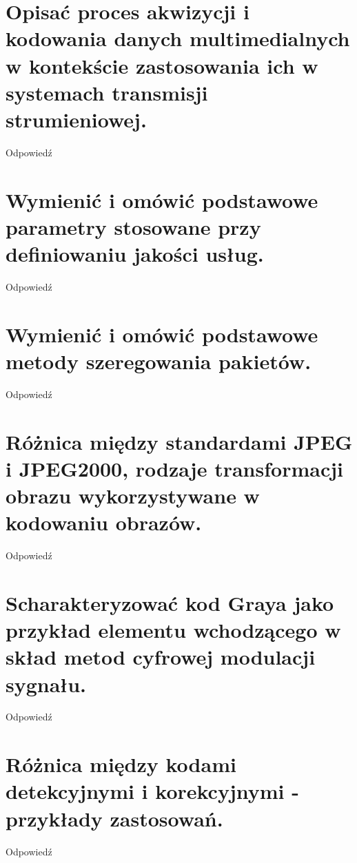\documentclass[12pt,a4paper]{article}
\begin{document}
	\section{Opisać proces akwizycji i kodowania danych multimedialnych w kontekście zastosowania ich w systemach transmisji strumieniowej.}
	Odpowiedź

	\section{Wymienić i omówić podstawowe parametry stosowane przy definiowaniu jakości usług.}
	Odpowiedź

	\section{Wymienić i omówić podstawowe metody szeregowania pakietów.}
	Odpowiedź

	\section{Różnica między standardami JPEG i JPEG2000, rodzaje transformacji obrazu wykorzystywane w kodowaniu obrazów.}
	Odpowiedź

	\section{Scharakteryzować kod Graya jako przykład elementu wchodzącego w skład metod cyfrowej modulacji sygnału.}
	Odpowiedź

	\section{Różnica między kodami detekcyjnymi i korekcyjnymi - przykłady zastosowań.}
	Odpowiedź
\end{document}
